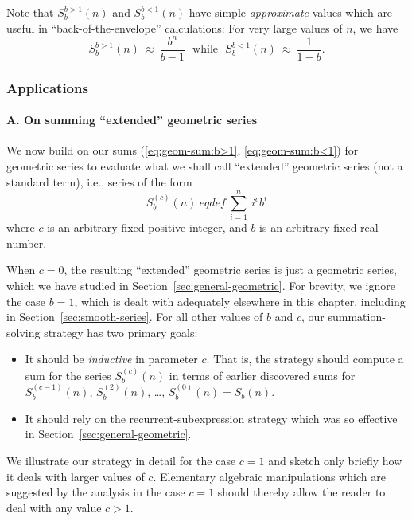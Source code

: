 Note that $S^{b>1}_{b}(n)$ and $S^{b<1}_{b}(n)$ have simple {\em
  approximate} values which are useful in ``back-of-the-envelope''
calculations: For very large values of $n$, we have
\begin{equation}
\label{eq:geom-sum:approx}
S^{b>1}_{b}(n) \ \approx \ \frac{b^n}{b-1} \ \ \
\mbox{while} \ \ \
S^{b<1}_{b}(n) \ \approx \ \frac{1}{1-b} .
\end{equation}

\subsubsection{Applications}

\paragraph{A. On summing ``extended'' geometric series}

We now build on our sums (\ref{eq:geom-sum:b>1},
\ref{eq:geom-sum:b<1}) for geometric series to evaluate what we shall
call ``extended'' geometric series (not a standard term), i.e., series
of the form
\[ S_b^{(c)}(n) \ eqdef \ \sum_{i=1}^n \ i^c b^i \]
where $c$ is an arbitrary fixed positive integer, and $b$ is an
arbitrary fixed real number.

When $c=0$, the resulting ``extended'' geometric series is just a
geometric series, which we have studied in
Section~\ref{sec:general-geometric}.  For brevity, we ignore the case
$b = 1$, which is dealt with adequately elsewhere in this chapter,
including in Section~\ref{sec:smooth-series}.  For all other values of
$b$ and $c$, our summation-solving strategy has two primary goals:
\begin{itemize}
\item
It should be {\em inductive} in parameter $c$.  That is, the strategy
should compute a sum for the series $S_b^{(c)}(n)$ in terms of earlier
discovered sums for $S_b^{(c-1)}(n)$, $S_b^{(2)}(n)$, \ldots,
$S_b^{(0)}(n) = S_b(n)$.

\item
It should rely on the recurrent-subexpression strategy which was so
effective in Section~\ref{sec:general-geometric}.
\end{itemize}
We illustrate our strategy in detail for the case $c=1$ and sketch
only briefly how it deals with larger values of $c$.  Elementary
algebraic manipulations which are suggested by the analysis in the
case $c=1$ should thereby allow the reader to deal with any value $c >
1$.

